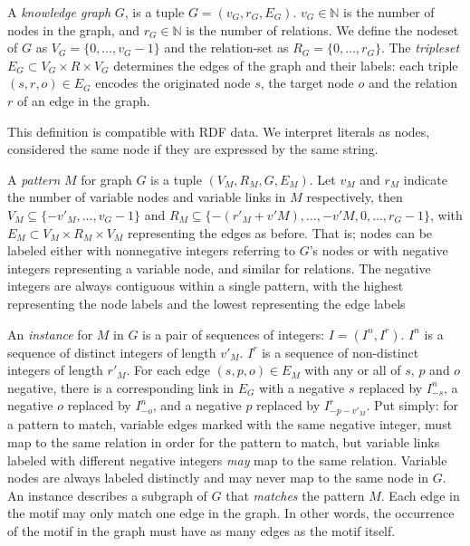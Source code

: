 \documentclass[runningheads]{style/llncs}
\newcommand{\N}{{\mathbb N}}
\begin{document}
A \emph{knowledge graph} $G$, is a tuple $G = (v_G, r_G, E_G)$. $v_G \in \N$ is the number of nodes in the graph, and $r_G \in \N$ is the number of relations. We define the nodeset of $G$ as $V_G = \{0, \ldots, v_G-1\}$ and the relation-set as $R_G = \{0, \ldots, r_G\}$. The \emph{tripleset} $E_G \subset V_G \times R \times V_G$ determines the edges of the graph and their labels: each triple $(s, r, o) \in E_G$ encodes the originated node $s$, the target node $o$ and the relation $r$ of an edge in the graph. 

This definition is compatible with RDF data. We interpret literals as nodes, considered the same node if they are expressed by the same string.


A \emph{pattern} $M$ for graph $G$ is a tuple $(V_M, R_M, G, E_M)$. Let $v_M$ and $r_M$ indicate the number of variable nodes and variable links in $M$ respectively, then $V_M \subseteq \{-v'_M, \ldots, v_G-1\}$ and $R_M \subseteq \{-(r'_M+v'M), \ldots,-v'M, 0,\ldots, r_G-1\}$, with $E_M \subset V_M \times R_M \times V_M$ representing the edges as before. That is; nodes can be labeled either with nonnegative integers referring to $G$'s nodes or with negative integers representing a variable node, and similar for relations. The negative integers are always contiguous within a single pattern, with the highest representing the node labels and the lowest representing the edge labels

An \emph{instance} for $M$ in $G$ is a pair of sequences of integers: $I = (I^n, I^r)$. $I^n$ is a sequence of distinct integers of length $v'_M$. $I^r$ is a sequence of non-distinct integers of length $r'_M$. For each edge $(s, p, o) \in E_M$ with any or all of $s$, $p$ and $o$ negative, there is a corresponding link in $E_G$ with a negative $s$ replaced by $I^n_{-s}$, a negative $o$ replaced by $I^n_{-o}$, and a negative $p$ replaced by $I^r_{-p - v'_M}$. Put simply: for a pattern to match, variable edges marked with the same negative integer, must map to the same relation in order for the pattern to match, but variable links labeled with different negative integers \emph{may} map to the same relation. Variable nodes are always labeled distinctly and may never map to the same node in $G$. An instance describes a subgraph of $G$ that \emph{matches} the pattern $M$. Each edge in the motif may only match one edge in the graph. In other words, the occurrence of the motif in the graph must have as many edges as the motif itself.\footnotemark
\end{document}
